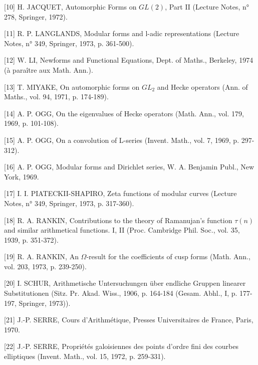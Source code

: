 \documentclass[10pt,oneside]{article}
\begin{document}
[10] H. JACQUET, Automorphic Forms on \(GL(2)\), Part II (Lecture Notes, n° 278, Springer, 1972).\par

[11] R. P. LANGLANDS, Modular forms and l-adic representations (Lecture Notes, n° 349, Springer, 1973, p. 361-500).\par

[12] W. LI, Newforms and Functional Equations, Dept. of Maths., Berkeley, 1974 (à paraître aux Math. Ann.).\par

[13] T. MIYAKE, On automorphic forms on \(GL_2\) and Hecke operators (Ann. of Maths., vol. 94, 1971, p. 174-189).\par

[14] A. P. OGG, On the eigenvalues of Hecke operators (Math. Ann., vol. 179, 1969, p. 101-108).\par

[15] A. P. OGG, On a convolution of L-series (Invent. Math., vol. 7, 1969, p. 297-312).\par

[16] A. P. OGG, Modular forms and Dirichlet series, W. A. Benjamin Publ., New York, 1969.\par

[17] I. I. PIATECKII-SHAPIRO, Zeta functions of modular curves (Lecture Notes, n° 349, Springer, 1973, p. 317-360).\par

[18] R. A. RANKIN, Contributions to the theory of Ramanujan's function \(\tau(n)\) and similar arithmetical functions. I, II (Proc. Cambridge Phil. Soc., vol. 35, 1939, p. 351-372).\par

[19] R. A. RANKIN, An \(\Omega\)-result for the coefficients of cusp forms (Math. Ann., vol. 203, 1973, p. 239-250).\par

[20] I. SCHUR, Arithmetische Untersuchungen über endliche Gruppen linearer Substitutionen (Sitz. Pr. Akad. Wiss., 1906, p. 164-184 (Gesam. Abhl., I, p. 177-197, Springer, 1973)).\par

[21] J.-P. SERRE, Cours d'Arithmétique, Presses Universitaires de France, Paris, 1970.\par

[22] J.-P. SERRE, Propriétés galoisiennes des points d'ordre fini des courbes elliptiques (Invent. Math., vol. 15, 1972, p. 259-331).\par
\end{document}
